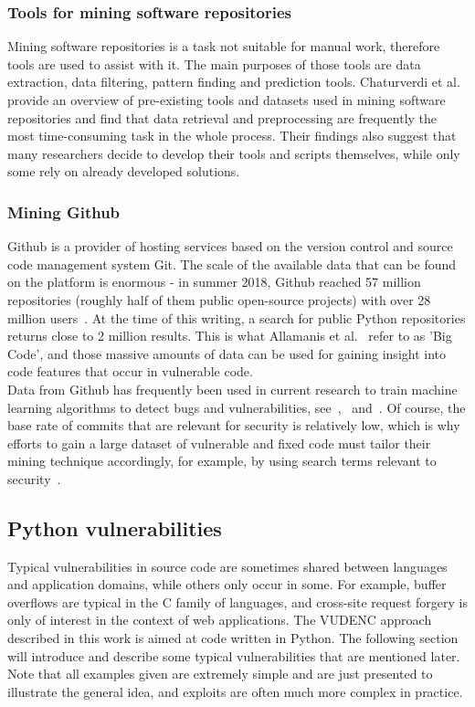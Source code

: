 \documentclass[
a4paper,
pagesize,
pdftex,
12pt,
twoside, %
BCOR=5mm, %
ngerman,
fleqn,
final,
]{scrartcl}
\begin{document}
	\subsubsection{Tools for mining software repositories}
	Mining software repositories is a task not suitable for manual work, therefore tools are used to assist with it. The main purposes of those tools are data extraction, data filtering, pattern finding and prediction tools. Chaturverdi et al.~\cite{Chaturvedi.2013} provide an overview of pre-existing tools and datasets used in mining software repositories and find that data retrieval and preprocessing are frequently the most time-consuming task in the whole process. Their findings also suggest that many researchers decide to develop their tools and scripts themselves, while only some rely on already developed solutions. 
	\subsubsection{Mining Github}
	Github is a provider of hosting services based on the version control and source code management system Git. The scale of the available data that can be found on the platform is enormous - in summer 2018, Github reached 57 million repositories (roughly half of them public open-source projects) with over 28 million users~\cite{Github.com.b}. At the time of this writing, a search for public Python repositories returns close to 2 million results. This is what Allamanis et al.~\cite{Allamanis.2018} refer to as 'Big Code', and those massive amounts of data can be used for gaining insight into code features that occur in vulnerable code.\\
	Data from Github has frequently been used in current research to train machine learning algorithms to detect bugs and vulnerabilities, see~\cite{Zhou.2017},~\cite{Russell.2018} and~\cite{Liu.2018}. Of course, the base rate of commits that are relevant for security is relatively low, which is why efforts to gain a large dataset of vulnerable and fixed code must tailor their mining technique accordingly, for example, by using search terms relevant to security~\cite{Zhou.2017}.
	
	\subsection{Python vulnerabilities}
	
	Typical vulnerabilities in source code are sometimes shared between languages and application domains, while others only occur in some. For example, buffer overflows are typical in the C family of languages, and cross-site request forgery is only of interest in the context of web applications. The VUDENC approach described in this work is aimed at code written in Python. The following section will introduce and describe some typical vulnerabilities that are mentioned later. Note that all examples given are extremely simple and are just presented to illustrate the general idea, and exploits are often much more complex in practice.
	
\end{document}
